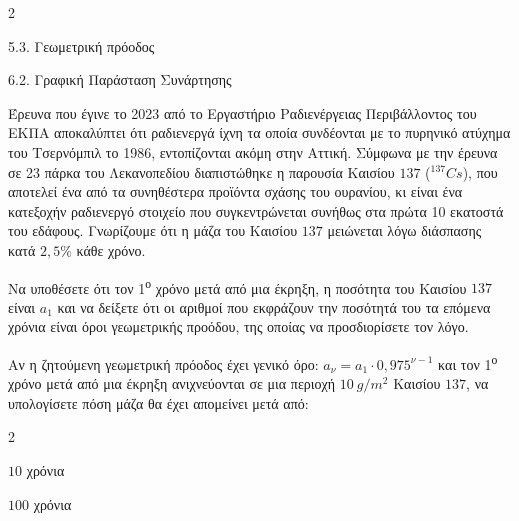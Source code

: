 \begin{ylh}{2}
    \item 5.3. Γεωμετρική πρόοδος
    \item 6.2. Γραφική Παράσταση Συνάρτησης
\end{ylh}
\begin{figure}
\end{figure}
Έρευνα που έγινε το 2023 από το Εργαστήριο Ραδιενέργειας Περιβάλλοντος του ΕΚΠΑ αποκαλύπτει ότι ραδιενεργά ίχνη τα οποία συνδέονται με το πυρηνικό ατύχημα του Τσερνόμπιλ το 1986, εντοπίζονται ακόμη στην Αττική. Σύμφωνα με την έρευνα σε 23 πάρκα του Λεκανοπεδίου διαπιστώθηκε η παρουσία Καισίου $137$ ($^{137}Cs$), που αποτελεί ένα από τα συνηθέστερα προϊόντα σχάσης του ουρανίου, κι είναι ένα κατεξοχήν ραδιενεργό στοιχείο που συγκεντρώνεται συνήθως στα πρώτα 10 εκατοστά του εδάφους. Γνωρίζουμε ότι η μάζα του Καισίου $137$ μειώνεται λόγω διάσπασης κατά $2{,}5\%$ κάθε χρόνο.

\begin{alist}
\item Να υποθέσετε ότι τον 1\textsuperscript{ο} χρόνο μετά από μια έκρηξη, η ποσότητα του Καισίου $137$ είναι $a_1$ και να δείξετε ότι οι αριθμοί που εκφράζουν την ποσότητά του τα επόμενα χρόνια είναι όροι γεωμετρικής προόδου, της οποίας να προσδιορίσετε τον λόγο.
\item Αν η ζητούμενη γεωμετρική πρόοδος έχει γενικό όρο: $a_{\nu} = a_1 \cdot 0{,}975^{\nu - 1}$ και τον 1\textsuperscript{ο} χρόνο μετά από μια έκρηξη ανιχνεύονται σε μια περιοχή $10\ g/m^{2}$ Καισίου $137$, να υπολογίσετε πόση μάζα θα έχει απομείνει μετά από:
\begin{multicols}{2}
\begin{rlist}
\item $10$ χρόνια
\item $100$ χρόνια
\end{rlist}
\end{multicols}
\end{alist}

